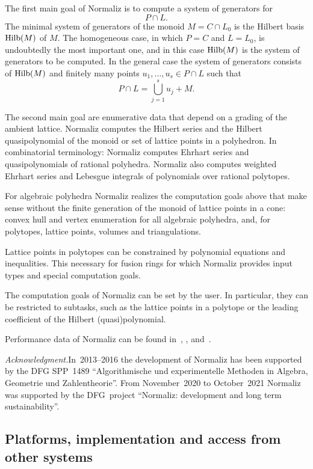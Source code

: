 The first main goal of Normaliz is to compute a system of generators for
$$
P\cap L.
$$
The minimal system of generators of the monoid $M=C\cap L_0$ is the Hilbert basis $\operatorname{Hilb}(M)$ of $M$. The homogeneous case, in which $P=C$ and $L=L_0$, is undoubtedly the most important one, and in this case $\operatorname{Hilb}(M)$ is the system of generators to be computed. In the general case the system of generators consists of $\operatorname{Hilb}(M)$ and finitely many points $u_1,\dots,u_s\in P\cap L$ such that
$$
P\cap L=\bigcup_{j=1}^s u_j+M.
$$

The second main goal are enumerative data that depend on a grading
of the ambient lattice. Normaliz computes the Hilbert series and
the Hilbert quasipolynomial of the monoid or set of lattice points in a polyhedron. In combinatorial terminology: Normaliz computes Ehrhart series and quasipolynomials of rational polyhedra. Normaliz also computes weighted
Ehrhart series and Lebesgue integrals of polynomials over
rational polytopes.

For algebraic polyhedra Normaliz realizes the computation goals above that make sense without the finite generation of the monoid of lattice points in a cone: convex hull and vertex enumeration for all algebraic polyhedra, and, for polytopes, lattice points, volumes and triangulations.

Lattice points in polytopes can be constrained by polynomial equations and inequalities. This necessary for fusion rings for which Normaliz provides input types and special computation goals.

The computation goals of Normaliz can be set by the user. In particular, they can be restricted to subtasks, such as the lattice points in a polytope or the leading coefficient of the Hilbert (quasi)polynomial.

Performance data of Normaliz can be found in~\cite{BruVol}, \cite{BI2}, \cite{BIS} and~\cite{BIS2}.

\emph{Acknowledgment.}\enspace In~2013--2016 the development of Normaliz has been supported by the DFG SPP~1489 ``Algorithmische und experimentelle Methoden in Algebra, Geometrie und Zahlentheorie''. From November~2020 to October~2021 Normaliz was supported by the DFG~project ``Normaliz: development and long term sustainability''.

\subsection{Platforms, implementation and access from other systems}

